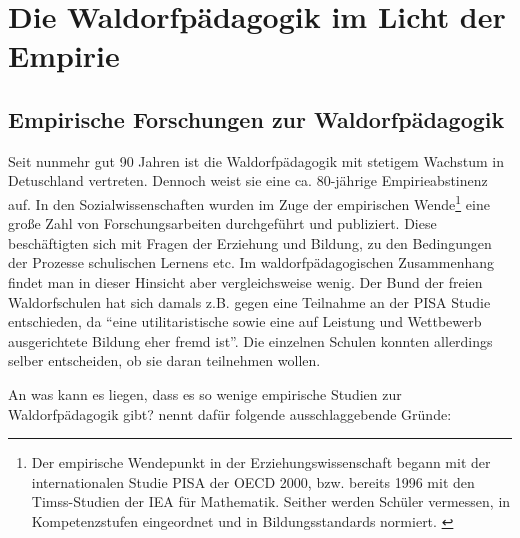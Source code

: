 \section{Die Waldorfpädagogik im Licht der Empirie}
\subsection{Empirische Forschungen zur Waldorfpädagogik} %
\label{sub:empirische_forschung}


Seit nunmehr gut 90 Jahren ist die Waldorfpädagogik mit stetigem Wachstum in Detuschland vertreten. Dennoch weist sie eine ca. 80-jährige Empirieabstinenz auf. In den Sozialwissenschaften wurden im Zuge der empirischen Wende\footnote{Der empirische Wendepunkt in der Erziehungswissenschaft begann mit der internationalen Studie PISA der OECD 2000, bzw. bereits 1996 mit den Timss-Studien der IEA für Mathematik. Seither werden Schüler vermessen, in Kompetenzstufen eingeordnet und in Bildungsstandards normiert. \citep[Vgl.][]{arp11}} eine große Zahl von Forschungsarbeiten durchgeführt und publiziert. Diese beschäftigten sich mit Fragen der Erziehung und Bildung, zu den Bedingungen der Prozesse schulischen Lernens etc. Im waldorfpädagogischen Zusammenhang findet man in dieser Hinsicht aber vergleichsweise wenig. Der Bund der freien Waldorfschulen hat sich damals z.B. gegen eine Teilnahme an der PISA Studie entschieden, da \enquote{eine utilitaristische sowie eine auf Leistung und Wettbewerb ausgerichtete Bildung eher fremd ist}. \citep[Vgl.][s.127ff]{paschen10}  Die einzelnen Schulen konnten allerdings selber entscheiden, ob sie daran teilnehmen wollen. 

An was kann es liegen, dass es so wenige empirische Studien zur Waldorfpädagogik gibt? \cite[S. 127f]{paschen10} nennt dafür folgende ausschlaggebende Gründe:

